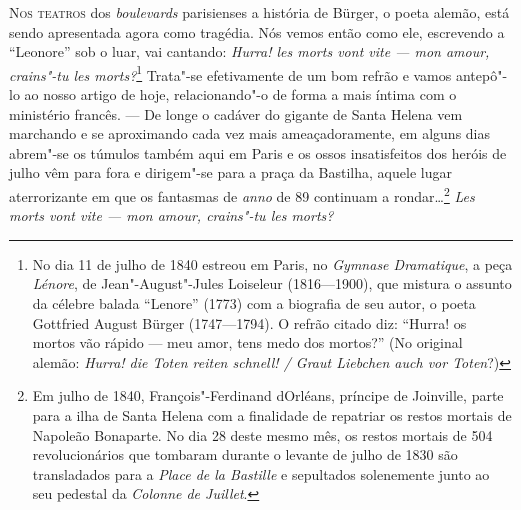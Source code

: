 \textsc{Nos teatros} dos \textit{boulevards} parisienses a história de Bürger, o
poeta alemão, está sendo apresentada agora como tragédia. Nós vemos
então como ele, escrevendo a “Leonore” sob o luar, vai cantando:
\textit{Hurra! les morts vont vite --- mon amour, crains"-tu les
morts?}\footnote{ No dia 11 de julho de 1840 estreou em Paris, no
\textit{Gymnase Dramatique}, a peça \textit{Lénore}, de
Jean"-August"-Jules Loiseleur (1816---1900), que mistura o assunto da
célebre balada “Lenore” (1773) com a biografia de seu autor, o poeta
Gottfried August Bürger (1747---1794). O refrão citado diz: “Hurra! os
mortos vão rápido --- meu amor, tens medo dos mortos?” (No original
alemão: \textit{Hurra! die Toten reiten schnell! / Graut Liebchen auch
vor Toten}?)} Trata"-se efetivamente de um bom refrão e vamos
antepô"-lo ao nosso artigo de hoje, relacionando"-o de forma a mais
íntima com o ministério francês. --- De longe o cadáver do gigante de
Santa Helena vem marchando e se aproximando cada vez mais
ameaçadoramente, em alguns dias abrem"-se os túmulos também aqui em
Paris e os ossos insatisfeitos dos heróis de julho vêm para fora e
dirigem"-se para a praça da Bastilha, aquele lugar aterrorizante em
que os fantasmas de \textit{anno} de 89 continuam a rondar\ldots\footnote{
Em julho de 1840, François"-Ferdinand d{\textquotesingle}Orléans,
príncipe de Joinville, parte para a ilha de Santa Helena com a
finalidade de repatriar os restos mortais de Napoleão Bonaparte. No dia
28 deste mesmo mês, os restos mortais de 504 revolucionários que
tombaram durante o levante de julho de 1830 são transladados para a
\textit{Place de la Bastille} e sepultados solenemente junto ao seu
pedestal da \textit{Colonne de Juillet}.} \textit{Les morts vont
vite --- mon amour, crains"-tu les morts?}

